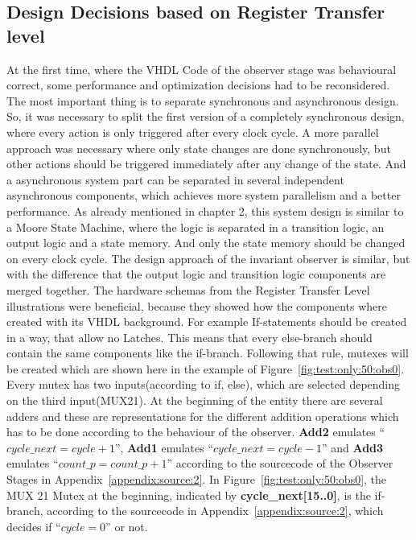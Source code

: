 \subsection{Design Decisions based on Register Transfer level}

At the first time, where the VHDL Code of the observer stage was behavioural correct, some performance and optimization decisions had to be reconsidered. 
The most important thing is to separate synchronous and asynchronous design. So, it was necessary to split the first version of a completely synchronous design, where
every action is only triggered after every clock cycle. A more parallel approach was necessary where only state changes are done synchronously, but other actions should
be triggered immediately after any change of the state. And a asynchronous system part can be separated in several independent asynchronous components, which achieves more 
system parallelism and a better performance. As already mentioned in  chapter 2, this system design is similar to a Moore State Machine, where the logic 
is separated in a transition logic, an output logic and a state memory. And only the state memory should be changed on every clock cycle.
The design approach of the invariant observer is similar, but with the difference that the output logic and transition logic components are merged together. 
The hardware schemas from the Register Transfer Level illustrations were beneficial, because they showed how the components where created with its VHDL background. 
For example If-statements should be created in a way, that allow no Latches. This means that every else-branch should contain the same components like the if-branch. 
Following that rule, mutexes will be created which are shown here in the example of Figure~\ref{fig:test:only:50:obs0}. Every mutex has two inputs(according to if, else), which are
selected depending on the third input(MUX21).
At the beginning of the entity there are several adders and these are representations for the different addition operations
which has to be done according to the behaviour of the observer. \textbf{Add2} emulates ``$cycle\_next=cycle+1$'', \textbf{Add1} emulates ``$cycle\_next=cycle-1$'' and \textbf{Add3}
emulates ``$count\_p=count\_p+1$'' according to the sourcecode of the Observer Stages in Appendix~\ref{appendix:source:2}. 
In Figure~\ref{fig:test:only:50:obs0}, the MUX 21 Mutex at the beginning, indicated by \textbf{cycle\_next[15..0]}, is the if-branch, according to the sourcecode in Appendix~\ref{appendix:source:2}, 
which decides if ``$cycle=0$'' or not.
